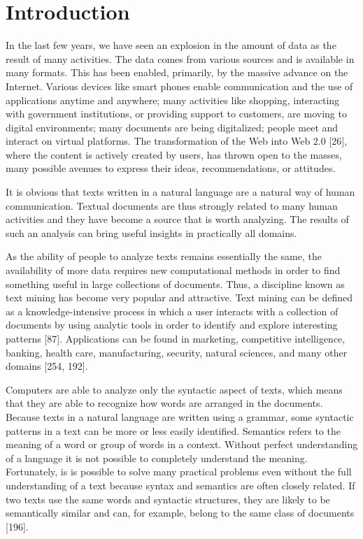 \documentclass[11pt,openany,executivepaper]{book}
\begin{document}
\section{Introduction}
\setlength{\parskip}{0pt}
\setlength{\parindent}{20pt}
In the last few years, we have seen an explosion in the amount of data as the result of many activities. The data comes from various sources and is available in many formats. This has been enabled, primarily, by the massive advance on the Internet. Various devices like smart phones enable communication and the use of applications anytime and anywhere; many activities like shopping, interacting with government institutions, or providing support to customers, are moving to digital environments; many documents are being digitalized; people meet and interact on virtual platforms. The transformation of the Web into Web 2.0 [26], where the content is actively created by users, has thrown open to the masses, many possible avenues to express their ideas, recommendations, or attitudes.

It is obvious that texts written in a natural language are a natural way of human communication. Textual documents are thus strongly related to many human activities and they have become a source that is worth analyzing. The results of such an analysis can bring useful insights in practically all domains.

As the ability of people to analyze texts remains essentially the same, the availability of more data requires new computational methods in order to find something useful in large collections of documents. Thus, a discipline known as text mining has become very popular and attractive. Text mining can be defined as a knowledge-intensive process in which a user interacts with a collection of documents by using analytic tools in order to identify and explore interesting patterns [87]. Applications can be found in marketing, competitive intelligence, banking, health care, manufacturing, security, natural sciences, and many other domains [254, 192].

Computers are able to analyze only the syntactic aspect of texts, which means that they are able to recognize how words are arranged in the documents. Because texts in a natural language are written using a grammar, some syntactic patterns in a text can be more or less easily identified. Semantics refers to the meaning of a word or group of words in a context. Without perfect understanding of a language it is not possible to completely understand the meaning. Fortunately, is is possible to solve many practical problems even without the full understanding of a text because syntax and semantics are often closely related. If two texts use the same words and syntactic structures, they are likely to be semantically similar and can, for example, belong to the same class of documents [196].
\end{document}
